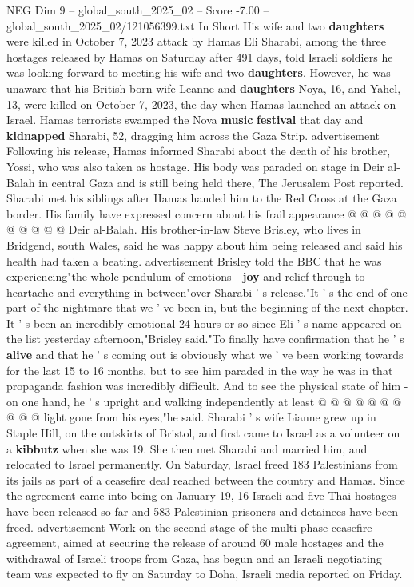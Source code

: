 \begin{textsample}{NEG Dim 9 – global\_south\_2025\_02 – Score -7.00 – global\_south\_2025\_02/121056399.txt}  \label{ex:f9_neg_187}
In Short His wife and two \textbf{daughters} were killed in October 7, 2023 attack by Hamas Eli Sharabi, among the three hostages released by Hamas on Saturday after 491 days, told Israeli soldiers he was looking forward to meeting his wife and two \textbf{daughters}.
However, he was unaware that his British-born wife Leanne and \textbf{daughters} Noya, 16, and Yahel, 13, were killed on October 7, 2023, the day when Hamas launched an attack on Israel.
Hamas terrorists swamped the Nova \textbf{music} \textbf{festival} that day and \textbf{kidnapped} Sharabi, 52, dragging him across the Gaza Strip. advertisement Following his release, Hamas informed Sharabi about the death of his brother, Yossi, who was also taken as hostage.
His body was paraded on stage in Deir al-Balah in central Gaza and is still being held there, The Jerusalem Post reported.
Sharabi met his siblings after Hamas handed him to the Red Cross at the Gaza border.
His family have expressed concern about his frail appearance @ @ @ @ @ @ @ @ @ @ Deir al-Balah.
His brother-in-law Steve Brisley, who lives in Bridgend, south Wales, said he was happy about him being released and said his health had taken a beating. advertisement Brisley told the BBC that he was experiencing"the whole pendulum of emotions - \textbf{joy} and relief through to heartache and everything in between"over Sharabi ' s release."It ' s the end of one part of the nightmare that we ' ve been in, but the beginning of the next chapter.
It ' s been an incredibly emotional 24 hours or so since Eli ' s name appeared on the list yesterday afternoon,"Brisley said."To finally have confirmation that he ' s \textbf{alive} and that he ' s coming out is obviously what we ' ve been working towards for the last 15 to 16 months, but to see him paraded in the way he was in that propaganda fashion was incredibly difficult.
And to see the physical state of him - on one hand, he ' s upright and walking independently at least @ @ @ @ @ @ @ @ @ @ light gone from his eyes,"he said.
Sharabi ' s wife Lianne grew up in Staple Hill, on the outskirts of Bristol, and first came to Israel as a volunteer on a \textbf{kibbutz} when she was 19.
She then met Sharabi and married him, and relocated to Israel permanently.
On Saturday, Israel freed 183 Palestinians from its jails as part of a ceasefire deal reached between the country and Hamas.
Since the agreement came into being on January 19, 16 Israeli and five Thai hostages have been released so far and 583 Palestinian prisoners and detainees have been freed. advertisement Work on the second stage of the multi-phase ceasefire agreement, aimed at securing the release of around 60 male hostages and the withdrawal of Israeli troops from Gaza, has begun and an Israeli negotiating team was expected to fly on Saturday to Doha, Israeli media reported on Friday.

\end{textsample}
